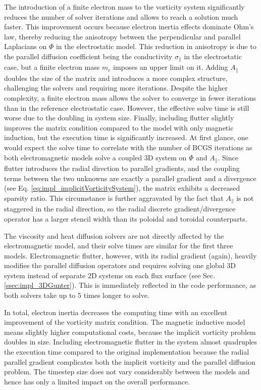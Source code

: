 The introduction of a finite electron mass to the vorticity system significantly reduces the number of solver iterations and allows to reach a solution much faster. This improvement occurs because electron inertia effects dominate Ohm's law, thereby reducing the anisotropy between the perpendicular and parallel Laplacians on $\Phi$ in the electrostatic model. This reduction in anisotropy is due to the parallel diffusion coefficient being the conductivity $\sigma_\parallel$ in the electrostatic case, but a finite electron mass $m_e$ imposes an upper limit on it. Adding $A_\parallel$ doubles the size of the matrix and introduces a more complex structure, challenging the solvers and requiring more iterations. Despite the higher complexity, a finite electron mass allows the solver to converge in fewer iterations than in the reference electrostatic case. However, the effective solve time is still worse due to the doubling in system size. Finally, including flutter slightly improves the matrix condition compared to the model with only magnetic induction, but the execution time is significantly increased. At first glance, one would expect the solve time to correlate with the number of BCGS iterations as both electromagnetic models solve a coupled 3D system on $\Phi$ and $A_\parallel$. Since flutter introduces the radial direction to parallel gradients, and the coupling terms between the two unknowns are exactly a parallel gradient and a divergence (see Eq. \ref{eq:impl_implicitVorticitySystem}), the matrix exhibits a decreased sparsity ratio. This circumstance is further aggravated by the fact that $A_\parallel$ is not staggered in the radial direction, so the radial discrete gradient/divergence operator has a larger stencil width than its poloidal and toroidal counterparts. \newline

The viscosity and heat diffusion solvers are not directly affected by the electromagnetic model, and their solve times are similar for the first three models. Electromagnetic flutter, however, with its radial gradient (again), heavily modifies the parallel diffusion operators and requires solving one global 3D system instead of separate 2D systems on each flux surface (see Sec. \ref{ssec:impl_3DGunter}). This is immediately reflected in the code performance, as both solvers take up to 5 times longer to solve. \newline

In total, electron inertia decreases the computing time with an excellent improvement of the vorticity matrix condition. The magnetic inductive model means slightly higher computational costs, because the implicit vorticity problem doubles in size. Including electromagnetic flutter in the system almost quadruples the execution time compared to the original implementation because the radial parallel gradient complicates both the implicit vorticity and the parallel diffusion problem. The timestep size does not vary considerably between the models and hence has only a limited impact on the overall performance.


